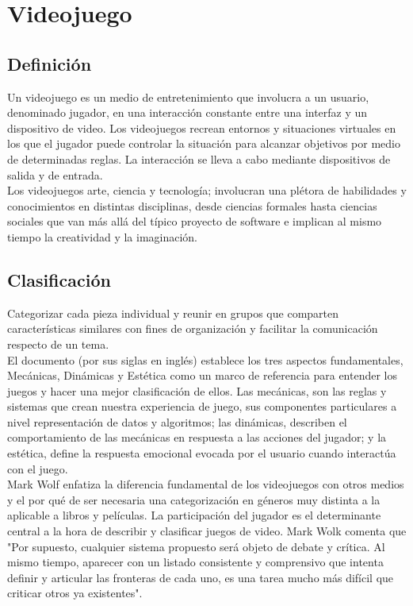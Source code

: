 \section{Videojuego}
\subsection{Definición}
Un videojuego es un medio de entretenimiento que involucra a un usuario, denominado jugador, en una interacción constante entre una interfaz y un dispositivo de video\cite[Morales Urrutia, 2010]{defVid}. Los videojuegos recrean	entornos y situaciones virtuales en los que el jugador puede controlar la situación para alcanzar objetivos por medio de determinadas reglas. La interacción se lleva a cabo mediante dispositivos de salida y de entrada.
\\[1pt]
		
Los videojuegos arte, ciencia y tecnología; involucran una plétora de habilidades y conocimientos en distintas disciplinas, desde ciencias formales hasta ciencias sociales que van más allá del típico proyecto de software e implican al mismo tiempo la creatividad y la imaginación.
\\[1pt]
					
\subsection{Clasificación}
Categorizar cada pieza individual y reunir en grupos que comparten características similares con fines de organización y facilitar la comunicación respecto de un tema.
\\[1pt]

El documento \cite[MDA]{vid10} (por sus siglas en inglés) establece los tres aspectos fundamentales, Mecánicas, Dinámicas y Estética como un marco de referencia para entender los juegos y hacer una mejor clasificación de ellos. Las mecánicas, son las reglas y sistemas que crean nuestra experiencia de juego, sus componentes particulares a nivel representación de datos y algoritmos; las dinámicas, describen el comportamiento de las mecánicas en respuesta a las acciones del jugador; y la estética, define la respuesta emocional evocada por el usuario cuando interactúa con el juego. 
\\[1pt]

Mark Wolf\cite{vid11} enfatiza la diferencia fundamental de los videojuegos con otros medios y el por qué de ser necesaria una categorización en géneros muy distinta a la aplicable a libros y películas. La participación del jugador es el determinante central a la hora de describir y clasificar juegos de video. Mark Wolk comenta que "Por supuesto, cualquier sistema propuesto será objeto de debate y crítica. Al mismo tiempo, aparecer con un listado consistente y comprensivo que intenta definir y articular las fronteras de cada uno, es una tarea mucho más difícil que criticar otros ya existentes".
\\[1pt]

